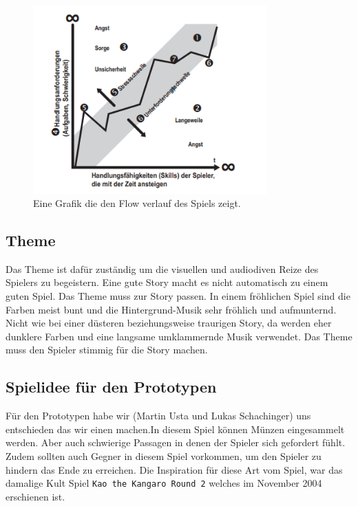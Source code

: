 \begin{figure}[H]
    \centering
    \includegraphics[width=0.8\textwidth]{chapters/15/images/GameFlow.png}
    \caption{Eine Grafik die den Flow verlauf des Spiels zeigt.}
    \label{UST-4}
\end{figure}


\subsection{Theme}
Das Theme ist dafür zuständig um die visuellen und audiodiven Reize des Spielers zu begeistern. Eine gute Story macht es nicht automatisch zu einem guten Spiel. Das Theme muss zur Story passen. In einem fröhlichen Spiel sind die Farben meist bunt und die Hintergrund-Musik sehr fröhlich und aufmunternd. Nicht wie bei einer düsteren beziehungsweise traurigen Story, da werden eher dunklere Farben und eine langsame umklammernde Musik verwendet. Das Theme muss den Spieler stimmig für die Story machen.



\subsection{Spielidee für den Prototypen}
Für den Prototypen habe wir (Martin Usta und Lukas Schachinger) uns entschieden das wir einen  machen.In diesem Spiel können Münzen eingesammelt werden. Aber auch schwierige Passagen in denen der Spieler sich gefordert fühlt. Zudem sollten auch Gegner in diesem Spiel vorkommen, um den Spieler zu hindern das Ende zu erreichen. Die Inspiration für diese Art vom Spiel, war das damalige Kult Spiel \verb+Kao the Kangaro Round 2+ welches im November 2004 erschienen ist.\\\\

